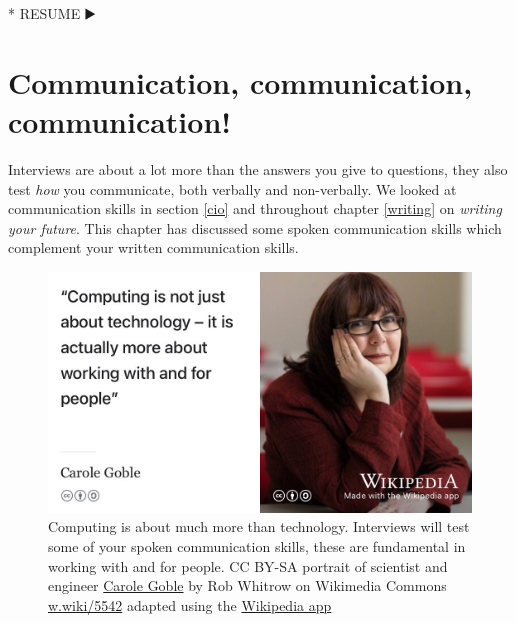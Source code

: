 \documentclass[
]{book}
\newenvironment{Shaded}{\begin{snugshade}}{\end{snugshade}}
\newcommand{\NormalTok}[1]{#1}
\newcommand{\SpecialStringTok}[1]{\textcolor[rgb]{0.31,0.60,0.02}{#1}}
\begin{document}
\begin{Shaded}
\begin{Highlighting}[]
\SpecialStringTok{* }\NormalTok{RESUME ▶️}
\end{Highlighting}
\end{Shaded}

\hypertarget{comms}{%
\section{Communication, communication, communication!}\label{comms}}

Interviews are about a lot more than the answers you give to questions, they also test \emph{how} you communicate, both verbally and non-verbally. We looked at communication skills in section \ref{cio} and throughout chapter \ref{writing} on \emph{writing your future}. This chapter has discussed some spoken communication skills which complement your written communication skills.

\begin{figure}

{\centering \includegraphics[width=0.98\linewidth]{images/carole-goble} 

}

\caption{Computing is about much more than technology. Interviews will test some of your spoken communication skills, these are fundamental in working with and for people. \citep{frengoble} CC BY-SA portrait of scientist and engineer \href{https://en.wikipedia.org/wiki/Carole_Goble}{Carole Goble} by Rob Whitrow on Wikimedia Commons \href{https://w.wiki/5542}{w.wiki/5542} adapted using the \href{https://apps.apple.com/gb/app/wikipedia/id324715238}{Wikipedia app}}\label{fig:carole-goble-fig}
\end{figure}
\end{document}
